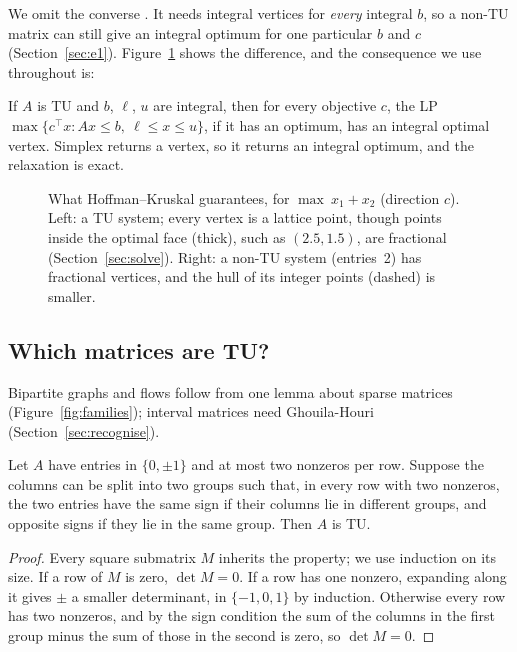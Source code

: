 We omit the converse \cite{schrijver1986}. It needs integral vertices for \emph{every} integral $b$, so a non-TU matrix can still give an integral optimum for one particular $b$ and $c$ (Section~\ref{sec:e1}). Figure~\ref{fig:hk} shows the difference, and the consequence we use throughout is:

\begin{corollary}\label{cor:lp-exact}
  If $A$ is TU and $b$, $\ell$, $u$ are integral, then for every objective $c$, the LP $\max\{c^\top x : Ax\le b,\ \ell\le x\le u\}$, if it has an optimum, has an integral optimal vertex. Simplex returns a vertex, so it returns an integral optimum, and the relaxation is exact.
\end{corollary}

\begin{figure}[H]
  \centering
  
  \caption{What Hoffman--Kruskal guarantees, for $\max\ x_1+x_2$ (direction $c$). Left: a TU system; every vertex is a lattice point, though points inside the optimal face (thick), such as $(2.5,1.5)$, are fractional (Section~\ref{sec:solve}). Right: a non-TU system (entries~2) has fractional vertices, and the hull of its integer points (dashed) is smaller.}
  \label{fig:hk}
\end{figure}

\subsection{Which matrices are TU?}\label{sec:families}

Bipartite graphs and flows follow from one lemma about sparse matrices (Figure~\ref{fig:families}); interval matrices need Ghouila-Houri (Section~\ref{sec:recognise}).

\begin{lemma}\label{lem:two}
  Let $A$ have entries in $\{0,\pm1\}$ and at most two nonzeros per row. Suppose the columns can be split into two groups such that, in every row with two nonzeros, the two entries have the same sign if their columns lie in different groups, and opposite signs if they lie in the same group. Then $A$ is TU.
\end{lemma}
\begin{proof}
  Every square submatrix $M$ inherits the property; we use induction on its size. If a row of $M$ is zero, $\det M=0$. If a row has one nonzero, expanding along it gives $\pm$ a smaller determinant, in $\{-1,0,1\}$ by induction. Otherwise every row has two nonzeros, and by the sign condition the sum of the columns in the first group minus the sum of those in the second is zero, so $\det M=0$.
\end{proof}


